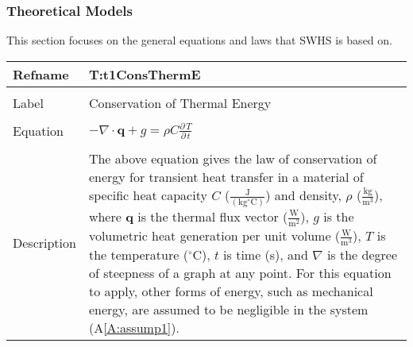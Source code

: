 \documentclass[12pt]{article}
\begin{document}
\subsubsection{Theoretical Models}
\label{Sec:TMs}
This section focuses on the general equations and laws that SWHS is based on.
~\newline
\noindent \begin{minipage}{\textwidth}
\begin{tabular}{p{} p{}}
\toprule \textbf{Refname} & \textbf{T:t1ConsThermE}
\label{T:t1ConsThermE}
\\ \midrule \\
Label & Conservation of Thermal Energy
\\ \midrule \\
Equation & $-∇\cdot{}\mathbf{q}+g=ρ C \frac{\partial{}\,T}{\partial{}\,t}$
\\ \midrule \\
Description & The above equation gives the law of conservation of energy for transient heat transfer in a material of specific heat capacity $C$ ($\frac{\text{J}}{(\text{kg}{}^{\circ}\text{C})}$) and density, $ρ$ ($\frac{\text{kg}}{\text{m}^{3}}$), where $\mathbf{q}$ is the thermal flux vector ($\frac{\text{W}}{\text{m}^{2}}$), $g$ is the volumetric heat generation per unit volume ($\frac{\text{W}}{\text{m}^{3}}$), $T$ is the temperature (${}^{\circ}$C), $t$ is time (s), and $∇$ is the degree of steepness of a graph at any point. For this equation to apply, other forms of energy, such as mechanical energy, are assumed to be negligible in the system (A\ref{A:assump1}).
\\ \bottomrule \end{tabular}
\end{minipage}\\
~\newline
\end{document}
